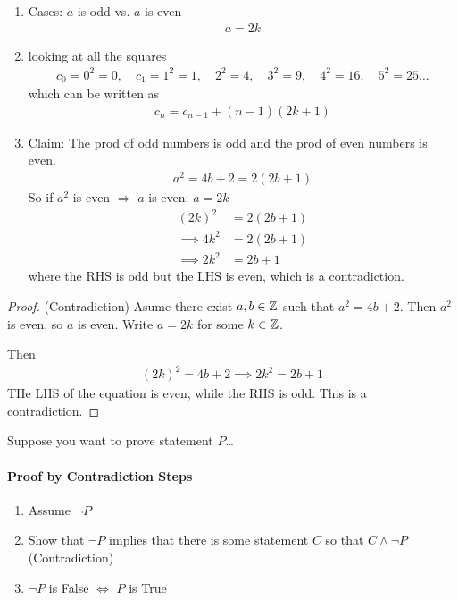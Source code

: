 \documentclass[../main.tex]{subfiles}
\begin{document}
\begin{enumerate}
    \item Cases: $a$ is odd vs. $a$ is even
    \begin{align*}
        a = 2k 
    \end{align*}
    \item looking at all the squares
    \begin{align*}
        c_0 = 0^2 = 0, \quad c_1 = 1^2 = 1, \quad 2^2 = 4, \quad 3^2 = 9, \quad 4^2 = 16, \quad 5^2 = 25 \dots
    \end{align*}
    which can be written as
    \begin{align*}
        c_n = c_{n - 1} + (n - 1)(2k + 1)
    \end{align*}
    \item Claim: The prod of odd numbers is odd and the prod of even numbers is even.
    \begin{align*}
        a^2 = 4b + 2 = 2(2b + 1)
    \end{align*}
    So if $a^2$ is even $\Rightarrow$ $a$ is even: $a = 2k$
    \begin{align*}
        (2k)^2 &= 2(2b + 1) \\
        \implies 4k^2 &= 2 (2b + 1) \\
        \implies 2k^2 &= 2b + 1 
    \end{align*}
    where the RHS is odd but the LHS is even, which is a contradiction.
\end{enumerate}
\begin{proof}
    (Contradiction) Asume there exist $a, b \in \mathbb{Z}$ such that $a^2 = 4b + 2$.
    Then $a^2$ is even, so $a$ is even. Write $a = 2k$ for some $k \in \mathbb{Z}$.

    Then
    \begin{align*}
        (2k)^2 = 4b + 2 \implies 2k^2 = 2b + 1
    \end{align*}
    THe LHS of the equation is even, while the RHS is odd. This is a contradiction.
\end{proof}

Suppose you want to prove statement $P$\dots

\paragraph{Proof by Contradiction Steps}

\begin{enumerate}
    \item Assume $\neg P$
    \item Show that $\neg P$ implies that there is some statement $C$ so that
    $C \land \neg P$ (Contradiction)
    \item $\neg P$ is False $\Leftrightarrow$ $P$ is True
\end{enumerate}
\end{document}
